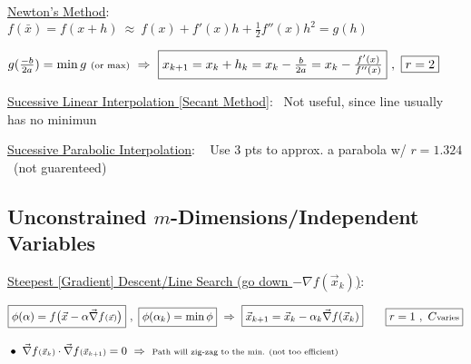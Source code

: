 \documentclass[12pt]{article}
\begin{document}
\vspace{15pt}
\underline{Newton's Method}: \ \(
    f(\bar{x}) = f(x+h) 
    \ \approx\ f(x) + f'(x) h + \tfrac{1}{2} f''(x) h^2 
    = g(h)
\) 

\vspace{5pt}
\hspace{10pt}\(
    g(\tfrac{-b}{2a}) = \min g \ \text{\scriptsize(or max)}
    \ \Rightarrow\ \boxed{ x_{k+1} = x_k + h_k = x_k - \tfrac{b}{2a} = x_k - \tfrac{f'(x)}{f''(x)} } \ ,\ \boxed{r=2}
\)

\vspace{15pt}
\underline{Sucessive Linear Interpolation [Secant Method]}: \ {\scriptsize Not useful, since line usually has no minimun}

\vspace{5pt}
\underline{Sucessive Parabolic Interpolation}: \ {
    \scriptsize Use 3 pts to approx. a parabola w/ \(\boxed{r = 1.324}\) \ (not guarenteed)
}

%
%
%
\vspace{5pt}
\subsection{Unconstrained \(m\)-Dimensions/Independent Variables}

\vspace{5pt}
\underline{Steepest [Gradient] Descent/Line Search (go down \( -\nabla f{\scriptstyle(\vec{x}_k)} \))}: 

\hspace{10pt} \(\begin{aligned}
    &\boxed{ \phi(\alpha) = f \big( \vec{x} - \alpha \vec{\nabla} f{\scriptstyle(\vec{x})} \big) }
        \ , \
        \boxed{ \phi(\alpha_k) = \min \phi }
        \ \Rightarrow \ 
        \boxed{ \vec{x}_{k+1} = \vec{x}_k - \alpha_k \vec{\nabla} f(\vec{x}_k) } 
        \hspace{20pt}
        \boxed{r=1 \ ,\ C \text{\scriptsize varies} }
        \\[10pt]
    &\bullet
        \ \vec{\nabla} f{ \scriptstyle ( \vec{x}_k ) } \cdot \vec{\nabla} f{ \scriptstyle ( \vec{x}_{k+1} ) } = 0
        \ \Rightarrow \ 
        \text{\scriptsize Path will zig-zag to the min. (not too efficient)}
\end{aligned}\)
\end{document}
